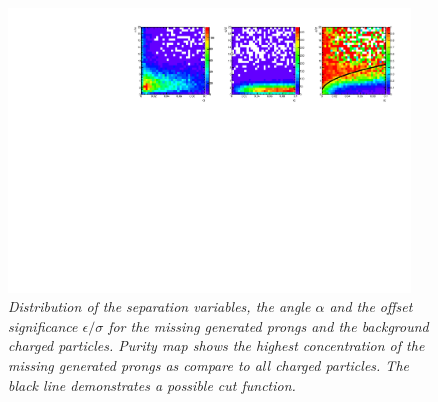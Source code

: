 \begin{figure}[h]
{\centering
    \includegraphics[width=0.95\textwidth]{ILD/plots/recovery-purity.pdf}
    \caption{\sl Distribution of the separation variables, the angle $\alpha$ and the offset significance $\epsilon/\sigma$ for the missing generated prongs and the background charged particles. Purity map shows the highest concentration of the missing generated prongs as compare to all charged particles. The black line demonstrates a possible cut function. %
    }
    \label{fig:RecoveryPurity_3}
  }
\end{figure}
